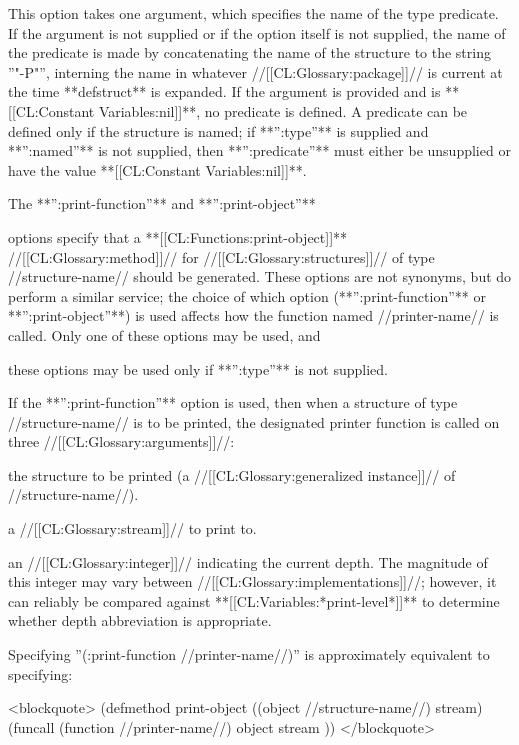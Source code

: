 This option takes one argument, which specifies the name of the type predicate. If the argument is not supplied or if the option itself is not supplied, the name of the predicate is made by concatenating the name of the structure to the string ''"-P"'', interning the name in whatever //[[CL:Glossary:package]]// is current at the time **defstruct** is expanded. If the argument is provided and is **[[CL:Constant Variables:nil]]**, no predicate is defined. A predicate can be defined only if the structure is named; if **'':type''** is supplied and **'':named''** is not supplied, then **'':predicate''** must either be unsupplied or have the value **[[CL:Constant Variables:nil]]**.


The **'':print-function''** and **'':print-object''**

options specify that a **[[CL:Functions:print-object]]** //[[CL:Glossary:method]]// for //[[CL:Glossary:structures]]// of type //structure-name// should be generated. These options are not synonyms, but do perform a similar service; the choice of which option (**'':print-function''** or **'':print-object''**) is used affects how the function named //printer-name// is called. Only one of these options may be used, and

these options may be used only if **'':type''** is not supplied.

If the **'':print-function''** option is used, then when a structure of type //structure-name// is to be printed, the designated printer function is called on three //[[CL:Glossary:arguments]]//:

\beginlist

\itemitem{--} the structure to be printed (a //[[CL:Glossary:generalized instance]]// of //structure-name//).

\itemitem{--} a //[[CL:Glossary:stream]]// to print to.

\itemitem{--} an //[[CL:Glossary:integer]]// indicating the current depth. The magnitude of this integer may vary between //[[CL:Glossary:implementations]]//; however, it can reliably be compared against **[[CL:Variables:*print-level*]]** to determine whether depth abbreviation is appropriate.

\endlist

Specifying ''(:print-function //printer-name//)'' is approximately equivalent to specifying:

<blockquote> (defmethod print-object ((object //structure-name//) stream) (funcall (function //printer-name//) object stream )) </blockquote>

